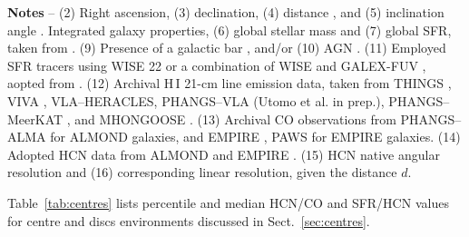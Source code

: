 \documentclass[letter, longauth]{aa} %
\newcommand*{\coone}{\ensuremath{\mathrm{CO(1-0)}}\xspace} %
\newcommand*{\cotwo}{\ensuremath{\mathrm{CO(2-1)}}\xspace} %
\newcommand*{\hone}{\ensuremath{\text{H}\,{\scriptstyle\text{I}}}\xspace}  %
\begin{document}
\begin{appendix}
\begin{table}
\begin{center}
{\begin{tabular}{cccccccccccccccc}
    \hline\hline
\end{tabular}
}
\end{center}
\footnotesize{
    \textbf{Notes} -- (2) Right ascension, (3) declination, (4) distance \citep{Anand2021}, and (5) inclination angle \citep{Lang2020}.
    Integrated galaxy properties, (6) global stellar mass and (7) global SFR, taken from \cite{Leroy2019}.
    (9) Presence of a galactic bar \citep{Herrera-Endoqui2015, Querejeta2021b}, and/or (10) AGN \citep{Veron2010}.
    (11) Employed SFR tracers using WISE \SI{22}{\micron} \citep{Wright2010} or a combination of WISE and GALEX-FUV \citep{Martin2005}, aopted from \citep{Leroy2019}.
    (12) Archival \hone 21-cm line emission data, taken from THINGS \citep{Walter2008}, VIVA \citep{Chung2009}, VLA--HERACLES, PHANGS--VLA (Utomo et al. in prep.), PHANGS--MeerKAT \citep[][; Pisano et al. in prep.]{Eibensteiner2024}, and MHONGOOSE \citep{deBlok2024}.
    (13) Archival CO observations from PHANGS--ALMA \citep[\cotwo;][]{Leroy2021b} for ALMOND galaxies, and EMPIRE \citep[\coone;][]{Jimenez-Donaire2019}, PAWS \citep[\coone;][]{Schinnerer2013} for EMPIRE galaxies.
    (14) Adopted HCN data from ALMOND \citep{Neumann2023a} and EMPIRE \citep{Jimenez-Donaire2019}. 
    (15) HCN native angular resolution and (16) corresponding linear resolution, given the distance $d$.
}
\end{table}

Table~\ref{tab:centres} lists percentile and median HCN/CO and SFR/HCN values for centre and discs environments discussed in Sect.~\ref{sec:centres}.


\end{appendix}
\end{document}
